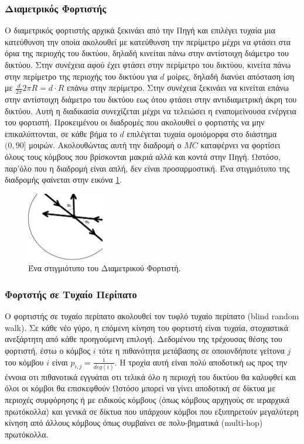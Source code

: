 \subsubsection{Διαμετρικός Φορτιστής}
Ο διαμετρικός φορτιστής αρχικά ξεκινάει από την Πηγή και επιλέγει τυχαία μια κατεύθυνση την οποία ακολουθεί με κατεύθυνση την περίμετρο μέχρι να φτάσει στα όρια της
περιοχής του δικτύου, δηλαδή κινείται πάνω στην αντίστοιχη διάμετρο του δικτύου. Στην συνέχεια αφού έχει φτάσει στην περίμετρο του δικτύου, κινείτα πάνω στην
περίμετρο της περιοχής του δικτύου για $d$ μοίρες, δηλαδή διανύει απόσταση ίση με $\frac{d}{2\pi}2\pi R = d\cdot R$ επάνω στην περίμετρο. Στην συνέχεια ξεκινάει να
κινείται επάνω στην αντίστοιχη διάμετρο του δικτύου εως ότου φτάσει στην αντιδιαμετρική άκρη του δικτύου. Αυτή η διαδικασία συνεχίζεται μέχρι να τελειώσει η
εναπομείνουσα ενέργεια του φορτιστή. Προκειμένου οι διαδρομές που ακολουθεί ο φορτιστής να μην επικαλύπτονται, σε κάθε βήμα το $d$ επιλέγεται τυχαία ομοιόμορφα στο
διάστημα $(0,90]$ μοιρών. Ακολουθώντας αυτή την διαδρομή ο $MC$ καταφέρνει να φορτίσει όλους τους κόμβους που βρίσκονται μακριά αλλά και κοντά στην Πηγή. Ωστόσο,
παρ'όλο που η διαδρομή είναι απλή, δεν είναι προσαρμοστική. Ένα στιγμιότυπο της διαδρομής φαίνεται στην εικόνα \ref{fig:diameter_charger}.
\vspace{0.9cm}
\begin{figure}[h]
	\centering
	\includegraphics[width=0.3\textwidth]{images/diameter.eps}
	\caption{Ένα στιγμιότυπο του Διαμετρικού Φορτιστή.}
	\label{fig:diameter_charger}
\end{figure}


\subsubsection{Φορτστής σε Τυχαίο Περίπατο}
Ο φορτιστής σε τυχαίο περίπατο ακολουθεί τον τυφλό τυχαίο περίπατο (blind random walk). Σε κάθε νέο γύρο, η επόμενη κίνηση του φορτιστή είναι τυχαία, στοχαστικά
ανεξάρτητη από κάθε προηγούμενη επιλογή. Δεδομένου της τρέχουσας θέσης του φορτιστή, έστω ο κόμβος $i$ τότε η πιθανότητα μετάβασης σε οποιονδήποτε γείτονα $j$ του
κόμβου $i$ είναι $p_{i,j} =\frac{1}{deg(i)}$. Η τροχία αυτή είναι πολύ αποδοτική ως προς την έννοια οτι πιθανοτικά εγγυάται οτι τελικά όλο η περιοχή του δικτύου θα
καλυφθεί και όλοι οι κόμβοι θα επισκεφθούν Ωστόσο μπορεί να γίνει αποδοτική σε δίκτυα με περιοχές συμφόρησης ή με ειδικούς κόμβους (όπως κόμβους αρχηγούς σε
ιεραρχικά πρωτόκολλα) και γενικά σε δίκτυα που υπάρχουν κόμβοι που εξυπηρετούν μεγαλύτερη κίνηση από άλλους κόμβους όπως συμβαίνει σε πολυ-βηματικά (multi-hop)
πρωτόκολλα.


